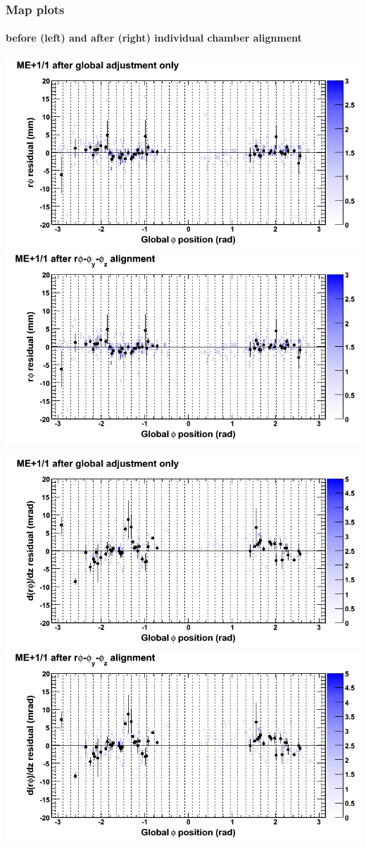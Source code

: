 \documentclass[compress]{beamer}
\begin{document}
\begin{frame}
\frametitle{Map plots}
\framesubtitle{before (left) and after (right) individual chamber alignment}
\includegraphics[width=0.5\linewidth]{ringmapplots_3dof/before_CSCvsphi_mep11_x.png} \includegraphics[width=0.5\linewidth]{ringmapplots_3dof/after_CSCvsphi_mep11_x.png}

\includegraphics[width=0.5\linewidth]{ringmapplots_3dof/before_CSCvsphi_mep11_dxdz.png} \includegraphics[width=0.5\linewidth]{ringmapplots_3dof/after_CSCvsphi_mep11_dxdz.png}
\end{frame}
\end{document}
